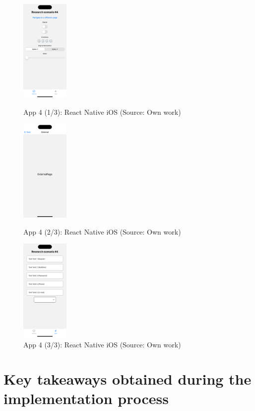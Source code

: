 \begin{figure}[H]
  \begin{minipage}{.31\textwidth}
    \centering
    \includegraphics[height=50mm]{img/app4_1_rn_ios}
    \caption{App 4 (1/3): React Native iOS (Source: Own work)}
    \label{fig:app4_1_rn_ios}
  \end{minipage}
  \hfill
  \begin{minipage}{.31\textwidth}
    \centering
    \includegraphics[height=50mm]{img/app4_2_rn_ios}
    \caption{App 4 (2/3): React Native iOS (Source: Own work)}
    \label{fig:app4_2_rn_ios}
  \end{minipage}
  \hfill
  \begin{minipage}{.31\textwidth}
    \centering
    \includegraphics[height=50mm]{img/app4_3_rn_ios}
    \caption{App 4 (3/3): React Native iOS (Source: Own work)}
    \label{fig:app4_3_rn_ios}
  \end{minipage}
\end{figure}

\section{Key takeaways obtained during the implementation process}


